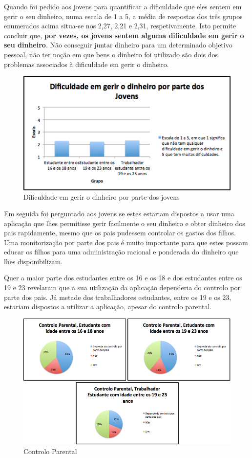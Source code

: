 \documentclass[12pt,a4paper]{article}
\begin{document}
      Quando foi pedido aos jovens para quantificar a dificuldade que eles sentem em gerir o seu dinheiro, numa escala de 1 a 5, a média de respostas dos três grupos enumerados acima situa-se nos 2,27, 2,21 e 2,31, respetivamente. Isto permite concluir que,\textbf{ por vezes, os jovens sentem alguma dificuldade em gerir o seu dinheiro}. Não conseguir juntar dinheiro para um determinado objetivo pessoal, não ter noção em que bens o dinheiro foi utilizado são dois dos problemas associados à dificuldade em gerir o dinheiro.

      \begin{figure}[ht!]
        \centering
          \includegraphics[width=0.7\linewidth]{img/img3}
          \caption{Dificuldade em gerir o dinheiro por parte dos jovens}
          \label{img3}
      \end{figure}

      Em seguida foi perguntado aos jovens se estes estariam dispostos a usar uma aplicação que lhes permitisse gerir facilmente o seu dinheiro e obter dinheiro dos pais rapidamente, mesmo que os pais pudessem controlar os gastos dos filhos. Uma monitorização por parte dos pais é muito importante para que estes possam educar os filhos para uma administração racional e ponderada do dinheiro que lhes disponibilizam.

      Quer a maior parte dos estudantes entre os 16 e os 18 e dos estudantes entre os 19 e 23 revelaram que a sua utilização da aplicação dependeria do controlo por parte dos pais. Já metade dos trabalhadores estudantes, entre os 19 e os 23, estariam dispostos a utilizar a aplicação, apesar do controlo parental.

      \begin{figure}[ht!]
        \centering
          \includegraphics[width=0.7\linewidth]{img/img4}
          \caption{Controlo Parental}
          \label{img4}
      \end{figure}      
\end{document}
